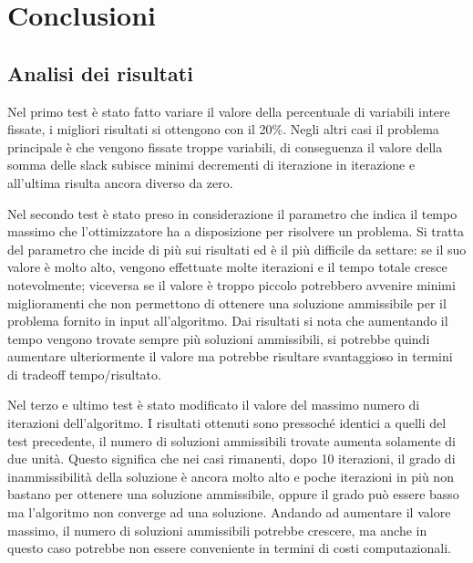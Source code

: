 \chapter{Conclusioni}%
\label{cha:Conclusioni}

\section{Analisi dei risultati}%
\label{sec:Analisi dei risultati}
Nel primo test è stato fatto variare il valore della percentuale di variabili
intere fissate, i migliori risultati si ottengono con il 20\%. 
Negli altri casi il problema principale è che vengono fissate troppe 
variabili, di conseguenza il valore della somma delle slack subisce 
minimi decrementi di iterazione in iterazione e all'ultima 
risulta ancora diverso da zero.

Nel secondo test è stato preso in considerazione il parametro che 
indica il tempo massimo che l'ottimizzatore ha a disposizione per risolvere
un problema.
Si tratta del parametro che incide di più sui risultati ed è il più difficile
da settare: se il suo valore è molto alto, vengono effettuate molte
iterazioni e il tempo totale cresce notevolmente; viceversa se il valore
è troppo piccolo potrebbero avvenire minimi miglioramenti che non permettono
di ottenere una soluzione ammissibile per il problema fornito in input
all'algoritmo.
Dai risultati si nota che aumentando il tempo vengono trovate sempre più soluzioni
ammissibili, si potrebbe quindi aumentare ulteriormente il 
valore ma potrebbe risultare svantaggioso in termini di tradeoff tempo/risultato.

Nel terzo e ultimo test è stato modificato il valore del massimo numero
di iterazioni dell'algoritmo.
I risultati ottenuti sono pressoché identici a quelli del test precedente,
il numero di soluzioni ammissibili trovate aumenta solamente di due unità.
Questo significa che nei casi rimanenti, dopo 10 iterazioni, il grado
di inammissibilità della soluzione è ancora molto alto e poche iterazioni
in più non bastano per ottenere una soluzione ammissibile, oppure il grado
può essere basso ma l'algoritmo non converge ad una soluzione.
Andando ad aumentare il valore massimo, il numero di soluzioni ammissibili potrebbe
crescere, ma anche in questo caso potrebbe non essere conveniente in
termini di costi computazionali.

